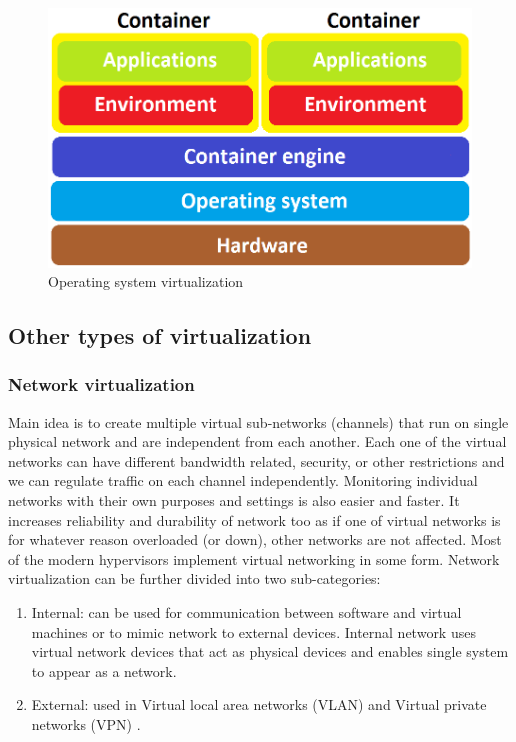 \begin{figure}[H]
\centering
\includegraphics[scale=0.4]{container.png}
\caption{Operating system virtualization}
\end{figure}


\subsection{Other types of virtualization}
\subsubsection{Network virtualization}
Main idea is to create multiple virtual sub-networks (channels) that run on single physical network and are independent from each another. Each one of the virtual networks can have different bandwidth related, security, or other restrictions and we can regulate traffic on each channel independently.  Monitoring individual networks with their own purposes and settings is also easier and faster. It increases reliability and durability of network too as if one of virtual networks is for whatever reason overloaded (or down), other networks are not affected. Most of the modern hypervisors implement virtual networking in some form. Network virtualization can be further divided into two sub-categories:
\begin{enumerate}
\item Internal: can be used for communication between software and virtual machines or to mimic network to external devices. Internal network uses virtual network devices that act as physical devices and enables single system to appear as a network.
\item External: used in Virtual local area networks (VLAN) and Virtual private networks (VPN) \cite{virt:iss_sec_thr_sol}.
\end{enumerate}


